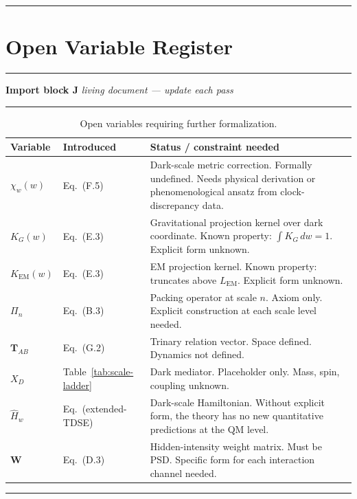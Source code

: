 \documentclass[11pt, a4paper, oneside]{article}
\theoremstyle{definition}
\theoremstyle{plain}
\theoremstyle{remark}
\begin{document}
\noindent\rule{\linewidth}{0.4pt}

\section{Open Variable Register}
\label{sec:open-vars}

\noindent\rule{\linewidth}{0.8pt}
\textbf{Import block J} \hfill \textit{living document --- update each pass}
\noindent\rule{\linewidth}{0.4pt}

\begin{table}[h]
  \centering
  \begin{tabularx}{\linewidth}{l l X}
	\toprule
	Variable & Introduced & Status / constraint needed \\
	\midrule
	$\chi_w(w)$ & Eq.\ (F.5) &
	  Dark-scale metric correction. Formally undefined. Needs physical
	  derivation or phenomenological ansatz from clock-discrepancy data. \\
	$K_G(w)$ & Eq.\ (E.3) &
	  Gravitational projection kernel over dark coordinate. Known property:
	  $\int K_G\,dw = 1$. Explicit form unknown. \\
	$K_\text{EM}(w)$ & Eq.\ (E.3) &
	  EM projection kernel. Known property: truncates above $L_\text{EM}$.
	  Explicit form unknown. \\
	$\Pi_n$ & Eq.\ (B.3) &
	  Packing operator at scale $n$. Axiom only. Explicit construction
	  at each scale level needed. \\
	$\mathbf{T}_{AB}$ & Eq.\ (G.2) &
	  Trinary relation vector. Space defined. Dynamics not defined. \\
	$X_D$ & Table~\ref{tab:scale-ladder} &
	  Dark mediator. Placeholder only. Mass, spin, coupling unknown. \\
	$\hat{H}_w$ & Eq.\ (extended-TDSE) &
	  Dark-scale Hamiltonian. Without explicit form, the theory has
	  no new quantitative predictions at the QM level. \\
	$\mathbf{W}$ & Eq.\ (D.3) &
	  Hidden-intensity weight matrix. Must be PSD. Specific form
	  for each interaction channel needed. \\
	\bottomrule
  \end{tabularx}
  \caption{Open variables requiring further formalization.}
  \label{tab:open-vars}
\end{table}

\noindent\rule{\linewidth}{0.4pt}
\end{document}
